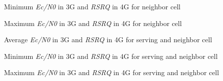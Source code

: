 %
{Minimum \textit{Ec/N0} in 3G and \textit{RSRQ} in 4G  for neighbor cell}

%
{Maximum \textit{Ec/N0} in 3G and \textit{RSRQ} in 4G for neighbor cell}


%
{Average \textit{Ec/N0} in 3G and \textit{RSRQ} in 4G for serving and neighbor cell}

%
{Minimum \textit{Ec/N0} in 3G and \textit{RSRQ} in 4G for serving and neighbor cell}

%
{Maximum \textit{Ec/N0} in 3G and \textit{RSRQ} in 4G for serving and neighbor cell}


